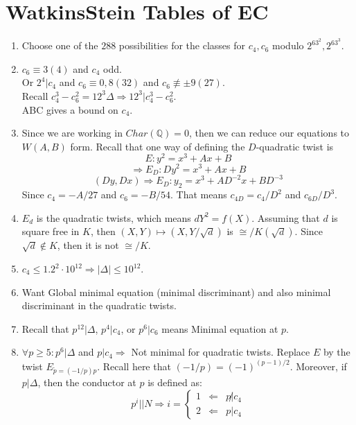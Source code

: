 \documentclass{article}
\newcommand{\Q}{\mathbb{Q}}
\newcommand{\Ra}{\Rightarrow}
\newcommand{\La}{\Leftarrow}
\begin{document}
\section{WatkinsStein Tables of EC}
\begin{multicols}{2}
\begin{enumerate}
\item Choose one of the $288$ possibilities for the classes for $c_4,c_6$ modulo $2^63^2,2^63^3$.

\item $c_6 \equiv 3 (4)$ and $c_4$ odd.\\
Or $2^4|c_4$ and $c_6 \equiv 0,8 (32)$ and $c_6 \not \equiv \pm 9 (27)$. \\
Recall $c_4^3 - c_6^2 = 12^3 \Delta \Ra 12^3|c_4^3 - c_6^2$.\\
ABC gives a bound on $c_4$.

\item Since we are working in $Char(\Q) = 0$, then we can reduce our equations to $W(A,B)$ form. Recall that one way of defining the $D$-quadratic twist is 
\[E: y^2 = x^3 + Ax + B \]
\[\Ra E_D: Dy^2 = x^3 + Ax + B\]
\[(Dy,Dx) \Ra E_D: y_2 = x^3 + AD^{-2}x + BD^{-3}\]
Since $c_4 = - A/27$ and $c_6 = -B/54$.
That means $c_{4D} = c_4/D^2$ and $c_{6D}/D^3$. 

\item $E_d$ is the quadratic twists, which means $dY^2 = f(X)$. Assuming that $d$ is square free in $K$, then $(X,Y) \mapsto (X,Y/\sqrt{d})$ is $\cong/K(\sqrt{d})$. Since $\sqrt{d} \notin K$, then it is not $\cong/K$. 

\item $c_4 \leq 1.2^2 \cdot 10^{12} \Ra |\Delta| \leq 10^{12}$.

\item Want Global minimal equation (minimal discriminant) and also minimal discriminant in the quadratic twists.



\item Recall that $p^{12}|\Delta$, $p^4|c_4$, or $p^6|c_6$ means Minimal equation at $p$.\\

\item $\forall p \geq 5: p^6|\Delta$ and $p|c_4 \Ra$ Not minimal for quadratic twists. Replace $E$ by the twist $E_{\tilde{p} = (-1/p)p}$. Recall here that $(-1/p) = (-1)^{(p-1)/2}$. Moreover, if $p|\Delta$, then the conductor at $p$ is defined as: 
\[p^i||N \Ra i = \left\{ \begin{array}{rcl} 1 & \La & p \not| c_4 \\ 2 & \La & p | c_4\end{array}\right.\]


\end{enumerate}
\end{multicols}
\end{document}
